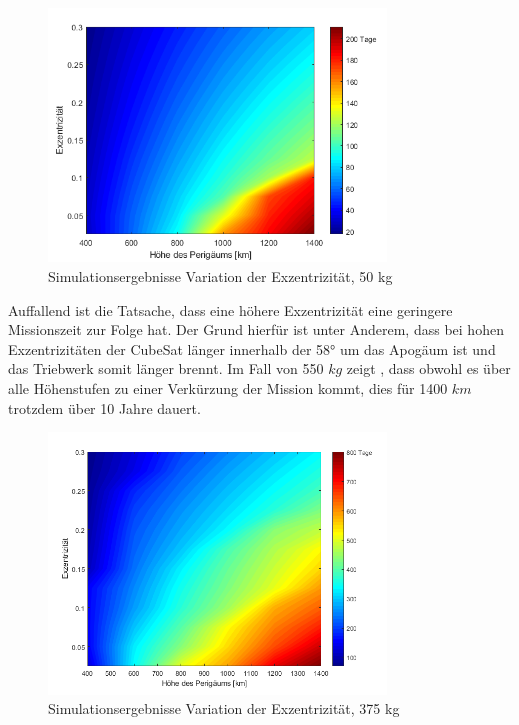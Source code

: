 \begin{figure}[h]
	\centering
		\includegraphics[width=0.80\textwidth]{./graphics/GMAT/ecc_perigee_50kg.png}
		\caption{Simulationsergebnisse Variation der Exzentrizität, 50 kg}
	\label{fig:GMAT_ecc_a}
\end{figure}

	Auffallend ist die Tatsache, dass eine höhere Exzentrizität eine geringere Missionszeit zur Folge hat. Der Grund hierfür ist unter Anderem, dass bei hohen Exzentrizitäten der CubeSat länger innerhalb der 58° um das Apogäum ist und das Triebwerk somit länger brennt. Im Fall von 550 $kg$ zeigt , dass obwohl es über alle Höhenstufen zu einer Verkürzung der Mission kommt, dies für 1400 $km$ trotzdem über 10 Jahre dauert. \newpage
	
	\begin{figure}[h]
	\centering
		\includegraphics[width=0.80\textwidth]{./graphics/GMAT/ecc_perigee_375kg.png}
		\caption{Simulationsergebnisse Variation der Exzentrizität, 375 kg}
	\label{fig:GMAT_ecc_b}
\end{figure}

